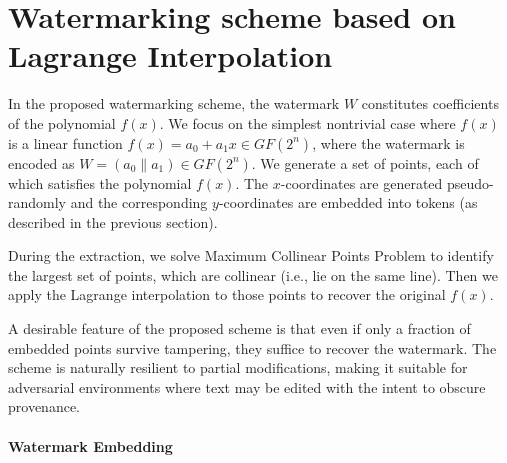 \documentclass[a4paper,11pt]{llncs}
\begin{document}
\section{Watermarking scheme based on Lagrange Interpolation}
\label{sec:watermarking_scheme}

In the proposed watermarking scheme, the watermark $W$ constitutes coefficients of the polynomial $f(x)$. We focus on the simplest nontrivial case where $f(x)$ is a linear function $f(x) = a_0 + a_1x \in GF(2^n)$, where the watermark is encoded as $W = (a_0 \| a_1) \in GF(2^n)$. We generate a set of points, each of which satisfies the polynomial $f(x)$. The $x$-coordinates are generated pseudo-randomly and the corresponding $y$-coordinates are embedded into tokens (as described in the previous section).

During the extraction, we solve Maximum Collinear Points Problem to identify the largest set of points, which are collinear (i.e., lie on the same line). Then we apply the Lagrange interpolation to those points to recover the original $f(x)$.  

A desirable feature of the proposed scheme is that even if only a fraction of embedded points survive tampering, they suffice to recover the watermark. The scheme is naturally resilient to partial modifications, making it suitable for adversarial environments where text may be edited with the intent to obscure provenance.

\paragraph{Watermark Embedding} 
\end{document}
